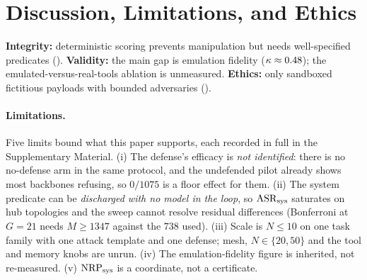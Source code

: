\section{Discussion, Limitations, and Ethics}
\label{sec:discussion}

\textbf{Integrity:} deterministic scoring prevents manipulation but needs well-specified
predicates (). \textbf{Validity:} the main gap is emulation fidelity
($\kappa\approx0.48$); the emulated-versus-real-tools ablation is unmeasured.
\textbf{Ethics:} only sandboxed fictitious payloads with bounded adversaries
().

\paragraph{Limitations.}
Five limits bound what this paper supports, each recorded in full in the Supplementary
Material. (i) The defense's efficacy is \emph{not identified}: there is no no-defense arm in
the same protocol, and the undefended pilot already shows most backbones refusing, so
$0/1075$ is a floor effect for them. (ii) The system predicate can be \emph{discharged with no
model in the loop}, so $\mathrm{ASR}_{\mathrm{sys}}$ saturates on hub topologies and the sweep cannot resolve
residual differences (Bonferroni at $G{=}21$ needs $M\ge1347$ against the $738$ used). (iii)
Scale is $N\le10$ on one task family with one attack template and one defense; mesh,
$N\in\{20,50\}$ and the tool and memory knobs are unrun. (iv) The emulation-fidelity figure is
inherited, not re-measured. (v) $\mathrm{NRP}_{\mathrm{sys}}$ is a coordinate, not a certificate.
